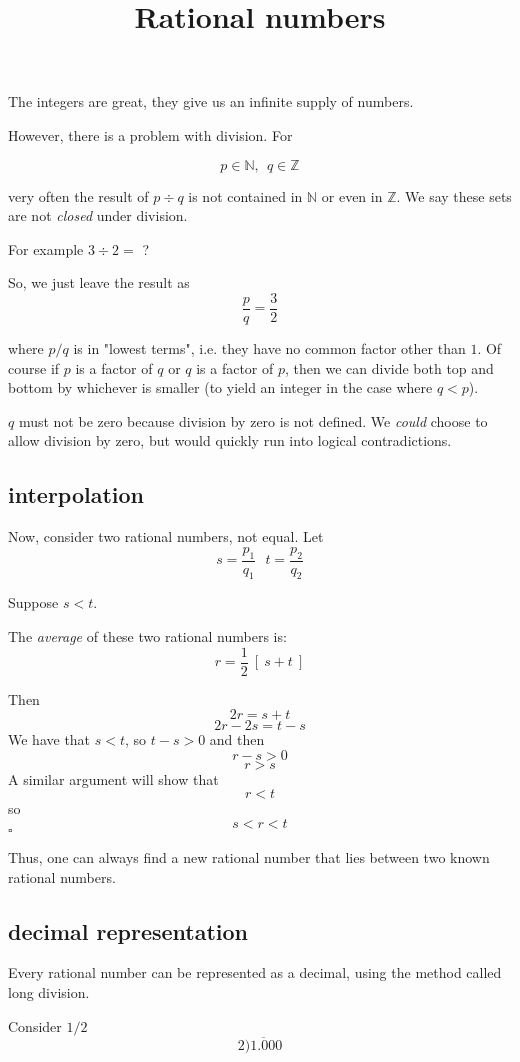 \documentclass[11pt, oneside]{article}
\title{Rational numbers}
\date{}
\begin{document}
\maketitle
\Large
The integers are great, they give us an infinite supply of numbers.

However, there is a problem with division.  For

\[ p \in \mathbb{N}, \ \ q \in \mathbb{Z} \]

very often the result of $p  \div q$ is not contained in $\mathbb{N}$ or even in $\mathbb{Z}$. We say these sets are not \emph{closed} under division.

For example $3 \div 2 =$ ?

So, we just leave the result as 
\[ \frac{p}{q} = \frac{3}{2} \]

where $p/q$ is in "lowest terms", i.e. they have no common factor other than $1$.  Of course if $p$ is a factor of $q$ or $q$ is a factor of $p$, then we can divide both top and bottom by whichever is smaller (to yield an integer in the case where $q < p$).

$q$ must not be zero because division by zero is not defined.  We \emph{could} choose to allow division by zero, but would quickly run into logical contradictions.

\subsection*{interpolation}
Now, consider two rational numbers, not equal.  Let
\[ s = \frac{p_1}{q_1} \ \ \ t = \frac{p_2}{q_2} \]

Suppose $s < t$.

The \emph{average} of these two rational numbers is:
\[ r = \frac{1}{2} \ [ \ s + t \ ] \]

Then
\[ 2r = s + t \]
\[ 2r - 2s = t - s \]
We have that $s < t$, so $t - s > 0$ and then
\[ r - s > 0 \]
\[ r  > s \]
A similar argument will show that
\[ r < t \]
so
\[ s < r < t \]
$\square$

Thus, one can always find a new rational number that lies between two known rational numbers.

\subsection*{decimal representation}

Every rational number can be represented as a decimal, using the method called long division.

Consider $1/2$
\[ 2 \overline{)1.000} \]
\end{document}
